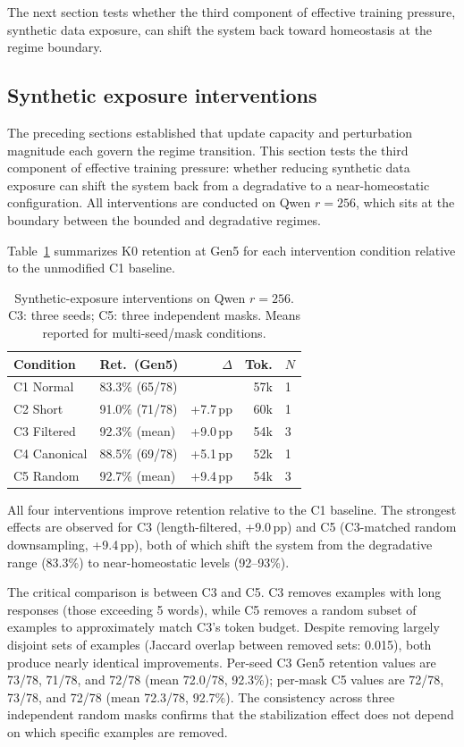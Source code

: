 \documentclass[a4paper,fleqn]{cas-dc}
\begin{document}
The next section tests whether the third component of effective training
pressure, synthetic data exposure, can shift the system back toward homeostasis
at the regime boundary.

\subsection{Synthetic exposure interventions}\label{sec:res_intervention}

The preceding sections established that update capacity and perturbation
magnitude each govern the regime transition. This section tests the third
component of effective training pressure: whether reducing synthetic data
exposure can shift the system back from a degradative to a near-homeostatic
configuration. All interventions are conducted on Qwen $r=256$, which sits at
the boundary between the bounded and degradative regimes.

Table~\ref{tab:interventions} summarizes K0 retention at Gen5 for each
intervention condition relative to the unmodified C1 baseline.

\begin{table}[width=.95\linewidth,cols=5,pos=htbp]
\caption{Synthetic-exposure interventions on Qwen $r=256$. C3: three seeds;
C5: three independent masks. Means reported for multi-seed/mask
conditions.}\label{tab:interventions}
\begin{tabular*}{\tblwidth}{@{} llrrl@{} }
\toprule
Condition & Ret.\ (Gen5) & $\Delta$ & Tok. & $N$ \\
\midrule
C1 Normal    & 83.3\% (65/78) &          & 57k & 1      \\
C2 Short     & 91.0\% (71/78) & +7.7\,pp & 60k & 1      \\
C3 Filtered  & 92.3\% (mean)  & +9.0\,pp & 54k & 3 \\
C4 Canonical & 88.5\% (69/78) & +5.1\,pp & 52k & 1      \\
C5 Random    & 92.7\% (mean)  & +9.4\,pp & 54k & 3 \\
\bottomrule
\end{tabular*}
\end{table}

All four interventions improve retention relative to the C1 baseline. The
strongest effects are observed for C3 (length-filtered, +9.0\,pp) and C5
(C3-matched random downsampling, +9.4\,pp), both of which shift the system from
the degradative range (83.3\%) to near-homeostatic levels (92--93\%).

The critical comparison is between C3 and C5. C3 removes examples with long
responses (those exceeding 5 words), while C5 removes a random subset of
examples to approximately match C3's token budget. Despite removing largely
disjoint sets of examples (Jaccard overlap between removed sets: 0.015), both
produce nearly identical improvements. Per-seed C3 Gen5 retention values are
73/78, 71/78, and 72/78 (mean 72.0/78, 92.3\%); per-mask C5 values are 72/78,
73/78, and 72/78 (mean 72.3/78, 92.7\%). The consistency across three
independent random masks confirms that the stabilization effect does not depend
on which specific examples are removed.
\end{document}
